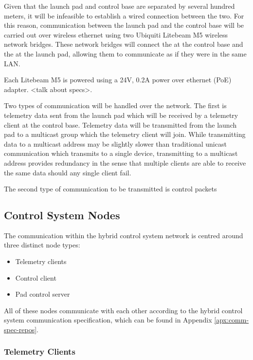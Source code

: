 Given that the launch pad and control base are separated by several hundred meters, it will be infeasible to establish 
a wired connection between the two. For this reason, communication between the launch pad and the control base will be
carried out over wireless ethernet using two Ubiquiti Litebeam M5 wireless network bridges. These network bridges will connect 
the  at the control base and the  at the launch pad, allowing them to communicate as if they 
were in the same LAN.

Each Litebeam M5 is powered using a 24V, 0.2A power over ethernet (PoE) adapter. <talk about specs>. 

Two types of communication will be handled over the network. The first is telemetry data sent from the launch pad which will be 
received by a telemetry client at the control base. Telemetry data will be transmitted from the launch pad to a 
multicast group which the telemetry client will join. While transmitting data to a  multicast address may be 
slightly slower than traditional  unicast communication which transmits to a single device, transmitting to a 
multicast address provides redundancy in the sense that multiple clients are able to receive the same data should any single client
fail.

The second type of communication to be transmitted is control packets

\subsection{Control System Nodes}

The communication within the hybrid control system network is centred around three distinct node types:

\begin{itemize}
    \item Telemetry clients
    \item Control client
    \item Pad control server
\end{itemize}

All of these nodes communicate with each other according to the hybrid control system communication specification,
which can be found in Appendix \ref{apx:comm-spec-repos}.

\subsubsection{Telemetry Clients}

